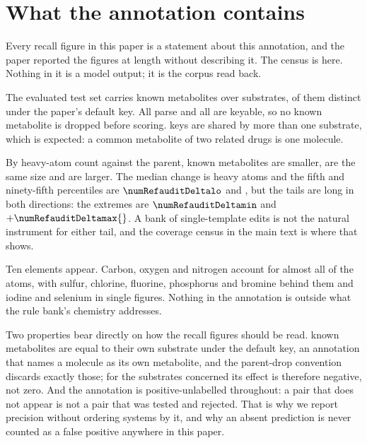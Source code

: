 \documentclass[journal=jcisd8,manuscript=suppinfo,layout=onecolumn]{achemso}
\begin{document}
\section{What the annotation contains}
\label{sec:si-annotation}

Every recall figure in this paper is a statement about this annotation, and the paper reported the
figures at length without describing it. The census is here. Nothing in it is a model output; it
is the corpus read back.

The evaluated test set carries \numRefauditReferences{} known metabolites over
\numRefauditSubstrates{} substrates, \numRefauditDistinct{} of them distinct under the paper's
default key. All \numRefauditReferences{} parse and all are keyable, so no known metabolite is dropped
before scoring. \numRefauditShared{} keys are shared by more than one substrate, which is expected:
a common metabolite of two related drugs is one molecule.

By heavy-atom count against the parent, \numRefauditSmaller{} known metabolites are smaller,
\numRefauditSame{} are the same size and \numRefauditLarger{} are larger. The median change is
\numRefauditDeltamedian{} heavy atoms and the fifth and ninety-fifth percentiles are
$\numRefauditDeltalo$ and \numRefauditDeltahi{}, but the tails are long in both directions: the
extremes are $\numRefauditDeltamin$ and $+\numRefauditDeltamax{}$. A bank of single-template edits
is not the natural instrument for either tail, and the coverage census in the main text is where
that shows.

Ten elements appear. Carbon, oxygen and nitrogen account for almost all of the atoms, with
sulfur, chlorine, fluorine, phosphorus and bromine behind them and iodine and selenium in single
figures. Nothing in the annotation is outside what the rule bank's chemistry addresses.

Two properties bear directly on how the recall figures should be read.
\numRefauditSelfref{} known metabolites are equal to their own substrate under the default key, an
annotation that names a molecule as its own metabolite, and the parent-drop convention
discards exactly those; for the substrates concerned its effect is therefore negative,
not zero. And the annotation is positive-unlabelled throughout: a pair that
does not appear is not a pair that was tested and rejected. That is why we report precision without
ordering systems by it, and why an absent prediction is never counted as a false positive
anywhere in this paper.
\end{document}
